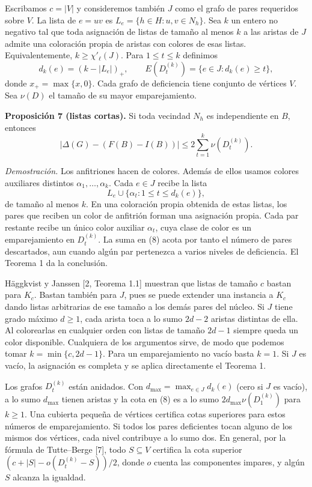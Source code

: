 \documentclass[spanish,11pt,a4paper]{article}
\begin{document}
Escribamos \(c=|V|\) y consideremos también \(J\) como el grafo de pares requeridos sobre \(V\). La lista de \(e=uv\) es \(L_e=\{h\in H:u,v\in N_h\}\). Sea \(k\) un entero no negativo tal que toda asignación de listas de tamaño al menos \(k\) a las aristas de \(J\) admite una coloración propia de aristas con colores de esas listas. Equivalentemente, \(k\ge\chi'_\ell(J)\). Para \(1\le t\le k\) definimos \[
d_k(e)=(k-|L_e|)_+,\qquad
E(D_t^{(k)})=\{e\in J:d_k(e)\ge t\},
\] donde \(x_+=\max\{x,0\}\). Cada grafo de deficiencia tiene conjunto de vértices \(V\). Sea \(\nu(D)\) el tamaño de su mayor emparejamiento.

\textbf{Proposición 7 (listas cortas).} Si toda vecindad \(N_h\) es independiente en \(B\), entonces \[
|\Delta(G)-(F(B)-I(B))|\le 2\sum_{t=1}^{k}\nu(D_t^{(k)}). \tag{8}
\]

\emph{Demostración.} Los anfitriones hacen de colores. Además de ellos usamos colores auxiliares distintos \(\alpha_1,\ldots,\alpha_k\). Cada \(e\in J\) recibe la lista \[
L_e\cup\{\alpha_t:1\le t\le d_k(e)\},
\] de tamaño al menos \(k\). En una coloración propia obtenida de estas listas, los pares que reciben un color de anfitrión forman una asignación propia. Cada par restante recibe un único color auxiliar \(\alpha_t\), cuya clase de color es un emparejamiento en \(D_t^{(k)}\). La suma en (8) acota por tanto el número de pares descartados, aun cuando algún par pertenezca a varios niveles de deficiencia. El Teorema 1 da la conclusión.

Häggkvist y Janssen {[}2, Teorema 1.1{]} muestran que listas de tamaño \(c\) bastan para \(K_c\). Bastan también para \(J\), pues se puede extender una instancia a \(K_c\) dando listas arbitrarias de ese tamaño a los demás pares del núcleo. Si \(J\) tiene grado máximo \(d\ge1\), cada arista toca a lo sumo \(2d-2\) aristas distintas de ella. Al colorearlas en cualquier orden con listas de tamaño \(2d-1\) siempre queda un color disponible. Cualquiera de los argumentos sirve, de modo que podemos tomar \(k=\min\{c,2d-1\}\). Para un emparejamiento no vacío basta \(k=1\). Si \(J\) es vacío, la asignación es completa y se aplica directamente el Teorema 1.

Los grafos \(D_t^{(k)}\) están anidados. Con \(d_{\max}=\max_{e\in J}d_k(e)\) (cero si \(J\) es vacío), a lo sumo \(d_{\max}\) tienen aristas y la cota en (8) es a lo sumo \(2d_{\max}\nu(D_1^{(k)})\) para \(k\ge1\). Una cubierta pequeña de vértices certifica cotas superiores para estos números de emparejamiento. Si todos los pares deficientes tocan alguno de los mismos dos vértices, cada nivel contribuye a lo sumo dos. En general, por la fórmula de Tutte--Berge {[}7{]}, todo \(S\subseteq V\) certifica la cota superior \((c+|S|-o(D_t^{(k)}-S))/2\), donde \(o\) cuenta las componentes impares, y algún \(S\) alcanza la igualdad.
\end{document}
